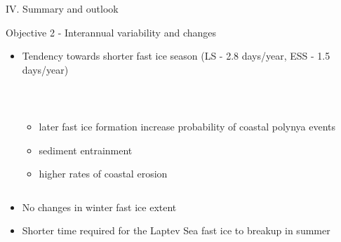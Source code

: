 \documentclass[8pt]{beamer}
\begin{document}
\setwatermark{\fontsize{125pt}{125pt}\selectfont{}}
\begin{frame}{IV. Summary and outlook}
	\begin{block}{Objective 2 - Interannual variability and changes}
		\begin{itemize}
			\item Tendency towards shorter fast ice season (LS - 2.8 days/year, ESS - 1.5 days/year)\\~\\
					\begin{columns}
						\begin{itemize}
							\item later fast ice formation increase probability of coastal polynya events
							\item sediment entrainment
														\item higher rates of coastal erosion

						\end{itemize}			
					\end{columns}
			\item No changes in winter fast ice extent
			\item Shorter time required for the Laptev Sea fast ice to breakup in summer 
		\end{itemize}
	\end{block}
\end{frame}
\end{document}
